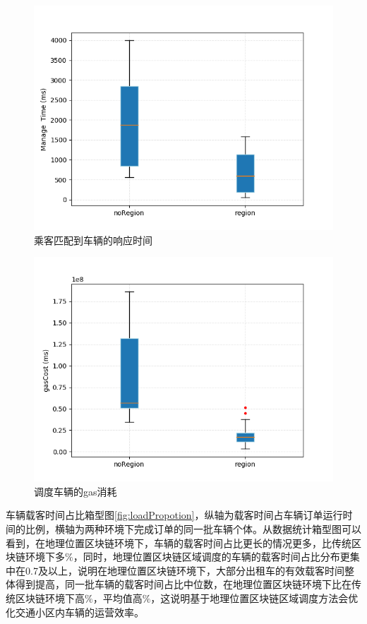 \begin{figure}
  \centering
  \includegraphics[width=1.0\textwidth]{figures/manageTime}
  \caption{乘客匹配到车辆的响应时间}\label{fig:manageTime}
\end{figure}

\begin{figure}
  \centering
  \includegraphics[width=1.0\textwidth]{figures/gasCost}
  \caption{调度车辆的gas消耗}\label{fig:gasCost}
\end{figure}

车辆载客时间占比箱型图\ref{fig:loadPropotion}，纵轴为载客时间占车辆订单运行时间的比例，横轴为两种环境下完成订单的同一批车辆个体。从数据统计箱型图可以看到，在地理位置区块链环境下，车辆的载客时间占比更长的情况更多，比传统区块链环境下多$\%$，同时，地理位置区块链区域调度的车辆的载客时间占比分布更集中在0.7及以上，说明在地理位置区块链环境下，大部分出租车的有效载客时间整体得到提高，同一批车辆的载客时间占比中位数，在地理位置区块链环境下比在传统区块链环境下高$\%$，平均值高$\%$，这说明基于地理位置区块链区域调度方法会优化交通小区内车辆的运营效率。

